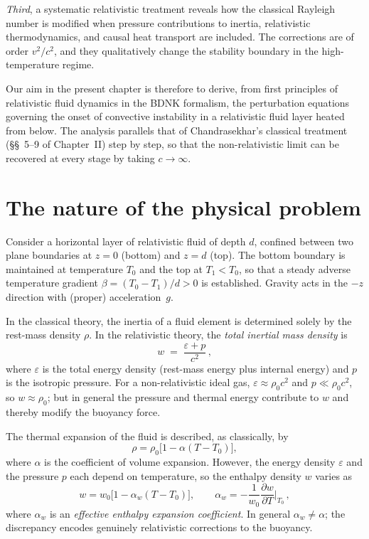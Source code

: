 \emph{Third}, a systematic relativistic treatment reveals how the
classical Rayleigh number is modified when pressure contributions to
inertia, relativistic thermodynamics, and causal heat transport are
included.  The corrections are of order $v^2/c^2$, and they qualitatively
change the stability boundary in the high-temperature regime.

Our aim in the present chapter is therefore to derive, from first principles
of relativistic fluid dynamics in the BDNK formalism, the perturbation
equations governing the onset of convective instability in a relativistic
fluid layer heated from below.  The analysis parallels that of
Chandrasekhar's classical treatment (\S\S~5--9 of Chapter~II) step by step,
so that the non-relativistic limit can be recovered at every stage by
taking $c \to \infty$.

\section{The nature of the physical problem}\label{sec:rel6}

Consider a horizontal layer of relativistic fluid of depth $d$, confined
between two plane boundaries at $z = 0$ (bottom) and $z = d$ (top).
The bottom boundary is maintained at temperature $T_0$ and the top at
$T_1 < T_0$, so that a steady adverse temperature gradient
$\beta = (T_0 - T_1)/d > 0$ is established.  Gravity acts in the
$-z$ direction with (proper) acceleration~$g$.

In the classical theory, the inertia of a fluid element is determined
solely by the rest-mass density $\rho$.  In the relativistic theory, the
\emph{total inertial mass density} is
\begin{equation}
\label{eq:rel2-1}
  w \;=\; \frac{\varepsilon + p}{c^2}\,,
\end{equation}
where $\varepsilon$ is the total energy density (rest-mass energy plus
internal energy) and $p$ is the isotropic pressure.  For a
non-relativistic ideal gas, $\varepsilon \approx \rho_0 c^2$ and
$p \ll \rho_0 c^2$, so $w \approx \rho_0$; but in general the
pressure and thermal energy contribute to $w$ and thereby modify the
buoyancy force.

The thermal expansion of the fluid is described, as classically, by
\begin{equation}
\label{eq:rel2-2}
  \rho = \rho_0\bigl[1 - \alpha(T - T_0)\bigr],
\end{equation}
where $\alpha$ is the coefficient of volume expansion.  However, the energy
density $\varepsilon$ and the pressure $p$ each depend on temperature, so
the enthalpy density $w$ varies as
\begin{equation}
\label{eq:rel2-3}
  w = w_0\bigl[1 - \alpha_w(T - T_0)\bigr], \qquad
  \alpha_w = -\frac{1}{w_0}\frac{\partial w}{\partial T}\bigg|_{T_0}\,,
\end{equation}
where $\alpha_w$ is an \emph{effective enthalpy expansion coefficient}.  In
general $\alpha_w \neq \alpha$; the discrepancy encodes genuinely
relativistic corrections to the buoyancy.

